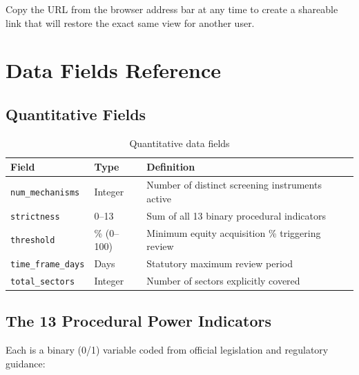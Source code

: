 \documentclass[12pt,a4paper]{article}
\newcommand{\fieldname}[1]{\texttt{\small#1}}
\begin{document}
Copy the URL from the browser address bar at any time to create a shareable link that will restore the exact same view for another user.

\section{Data Fields Reference}
\label{sec:fields}

\subsection{Quantitative Fields}

\begin{table}[h]
\centering
\begin{tabularx}{\linewidth}{llX}
\toprule
\textbf{Field} & \textbf{Type} & \textbf{Definition} \\
\midrule
\fieldname{num\_mechanisms} & Integer & Number of distinct screening instruments active \\
\fieldname{strictness} & 0--13 & Sum of all 13 binary procedural indicators \\
\fieldname{threshold} & \% (0--100) & Minimum equity acquisition \% triggering review \\
\fieldname{time\_frame\_days} & Days & Statutory maximum review period \\
\fieldname{total\_sectors} & Integer & Number of sectors explicitly covered \\
\bottomrule
\end{tabularx}
\caption{Quantitative data fields}
\end{table}

\subsection{The 13 Procedural Power Indicators}

Each is a binary (0/1) variable coded from official legislation and regulatory guidance:
\end{document}
